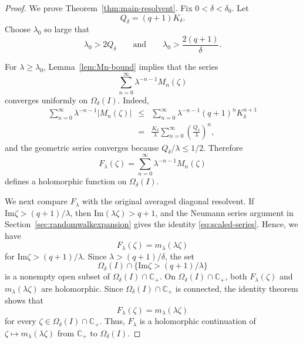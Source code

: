 \documentclass[a4paper,11pt]{article}
\newcommand{\Impart}{\mathrm{Im}}
\begin{document}
\begin{proof}
We prove Theorem~\ref{thm:main-resolvent}. 
Fix $0<\delta<\delta_0$.
Let
$$
Q_\delta=(q+1)K_\delta.
$$
Choose $\lambda_0$ so large that
$$
\lambda_0>2Q_\delta
\qquad
\text{and}
\qquad
\lambda_0>\frac{2(q+1)}{\delta}.
$$

For $\lambda\ge\lambda_0$, Lemma~\ref{lem:Mn-bound} implies that the
series
$$
\sum_{n=0}^{\infty}\lambda^{-n-1}M_n(\zeta)
$$
converges uniformly on $\Omega_\delta(I)$. Indeed,
\begin{eqnarray}
\sum_{n=0}^{\infty}\lambda^{-n-1}|M_n(\zeta)|
&\le&
\sum_{n=0}^{\infty}\lambda^{-n-1}(q+1)^nK_\delta^{n+1}
\nonumber\\
&=&
\frac{K_\delta}{\lambda}
\sum_{n=0}^{\infty}
\left(\frac{Q_\delta}{\lambda}\right)^n,
\label{eq:uniform-series-bound}
\end{eqnarray}
and the geometric series converges because $Q_\delta/\lambda\le1/2$.
Therefore
\begin{equation}
\label{eq:F-lambda-def}
F_\lambda(\zeta)
=
\sum_{n=0}^{\infty}\lambda^{-n-1}M_n(\zeta)
\end{equation}
defines a holomorphic function on $\Omega_\delta(I)$.

We next compare $F_\lambda$ with the original averaged diagonal resolvent.
If $\Impart \zeta>(q+1)/\lambda$, then
$\Impart (\lambda\zeta)>q+1$, and the Neumann series argument in
Section~\ref{sec:randomwalkexpansion} gives the identity \eqref{eq:scaled-series}. 
Hence, we have
$$
F_\lambda(\zeta)=m_\lambda(\lambda\zeta)
$$
for $\Impart \zeta>(q+1)/\lambda$. 
Since $\lambda>(q+1)/\delta$, the set
$$
\Omega_\delta(I)\cap\{\Impart \zeta>(q+1)/\lambda\}
$$
is a nonempty open subset of $\Omega_\delta(I)\cap\mathbb C_+$.
On $\Omega_\delta(I)\cap\mathbb C_+$, both $F_\lambda(\zeta)$ and
$m_\lambda(\lambda\zeta)$ are holomorphic. 
Since $\Omega_\delta(I)\cap\mathbb C_+$ is connected, the identity theorem shows that
$$
F_\lambda(\zeta)=m_\lambda(\lambda\zeta)
$$
for every $\zeta\in\Omega_\delta(I)\cap\mathbb C_+$. 
Thus, $F_\lambda$ is a holomorphic continuation of
$\zeta\mapsto m_\lambda(\lambda\zeta)$ from $\mathbb C_+$ to $\Omega_\delta(I)$.


\end{proof}
\end{document}
